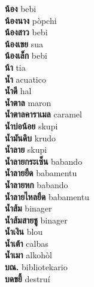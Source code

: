 \textbf{ น้อง  } bebi \\
\textbf{ น้องนาง  } pòpchi \\
\textbf{ น้องสาว  } bebi \\
\textbf{ น้องเขย  } sua \\
\textbf{ น้องเล็ก  } bebi \\
\textbf{ น้า  } tia \\
\textbf{ น้ำ  } acuatico \\
\textbf{ น้ำดี  } hal \\
\textbf{ น้ำตาล  } maron \\
\textbf{ น้ำตาลคาราเมล  } caramel \\
\textbf{ น้ำบ่อน้อย  } skupi \\
\textbf{ น้ำมันดิบ  } krudo \\
\textbf{ น้ำลาย  } skupi \\
\textbf{ น้ำลายกระเซ็น  } babando \\
\textbf{ น้ำลายยืด  } babamentu \\
\textbf{ น้ำลายหก  } babando \\
\textbf{ น้ำลายไหลยืด  } babamentu \\
\textbf{ น้ำส้ม  } binager \\
\textbf{ น้ำส้มสายชู  } binager \\
\textbf{ น้ำเงิน  } blou \\
\textbf{ น้ำเต้า  } calbas \\
\textbf{ น้ำเมา  } alkohòl \\
\textbf{ บณ.  } bibliotekario \\
\textbf{ บดขยี้  } destruí \\
